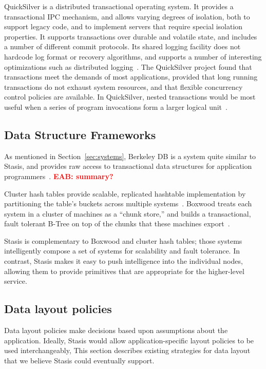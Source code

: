 \documentclass[letterpaper,twocolumn,10pt]{article}
\newcommand{\yad}{Stasis\xspace}
\newcommand{\eab}[1]{\textcolor{red}{\bf EAB: #1}}
\begin{document}
QuickSilver is a distributed transactional operating system.  It
provides a transactional IPC mechanism, and
allows varying degrees of isolation, both to support legacy code, and
to implement servers that require special isolation properties.  It
supports transactions over durable and volatile state, and includes a
number of different commit protocols.  Its shared logging facility does not
hardcode log format or recovery algorithms, and supports a number
of interesting optimizations such as distributed
logging~\cite{recoveryInQuickSilver}.  The QuickSilver project found
that transactions meet the demands of most
applications, provided that long running transactions do not exhaust
system resources, and that flexible concurrency control policies are
available.  In QuickSilver, nested transactions would
be most useful when a series of program invocations
form a larger logical unit~\cite{experienceWithQuickSilver}.

\subsection{Data Structure Frameworks}

As mentioned in Section~\ref{sec:systems}, Berkeley DB is a system
quite similar to \yad, and provides raw access to
transactional data structures for application
programmers~\cite{libtp}.  \eab{summary?}

Cluster hash tables provide scalable, replicated hashtable
implementation by partitioning the table's buckets across multiple
systems~\cite{DDS}.  Boxwood treats each system in a cluster of machines as a
``chunk store,'' and builds a transactional, fault tolerant B-Tree on
top of the chunks that these machines export~\cite{boxwood}.  

\yad is complementary to Boxwood and cluster hash tables; those
systems intelligently compose a set of systems for scalability and
fault tolerance.  In contrast, \yad makes it easy to push intelligence
into the individual nodes, allowing them to provide primitives that
are appropriate for the higher-level service.  



\subsection{Data layout policies}
\label{sec:malloc}
Data layout policies make decisions based upon
assumptions about the application.  Ideally, \yad would allow
application-specific layout policies to be used interchangeably, 
This section describes existing strategies for data
layout that we believe \yad could eventually support.
\end{document}
